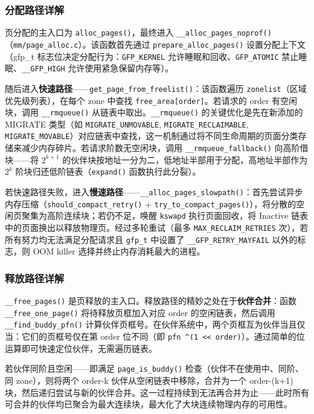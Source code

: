 \documentclass[a4paper]{article}
\begin{document}
\subsubsection{分配路径详解}

页分配的主入口为 \texttt{alloc\_pages()}，最终进入 \texttt{\_\_alloc\_pages\_noprof()}（\texttt{mm/page\_alloc.c}）。该函数首先通过 \texttt{prepare\_alloc\_pages()} 设置分配上下文（gfp\_t 标志位决定分配行为：\texttt{GFP\_KERNEL} 允许睡眠和回收、\texttt{GFP\_ATOMIC} 禁止睡眠、\texttt{\_\_GFP\_HIGH} 允许使用紧急保留内存等）。

随后进入\textbf{快速路径}——\texttt{get\_page\_from\_freelist()}：该函数遍历 \texttt{zonelist}（区域优先级列表），在每个 zone 中查找 \texttt{free\_area[order]}。若请求的 order 有空闲块，调用 \texttt{\_\_rmqueue()} 从链表中取出。\texttt{\_\_rmqueue()} 的关键优化是先在新添加的 MIGRATE 类型（如 \texttt{MIGRATE\_UNMOVABLE}, \texttt{MIGRATE\_RECLAIMABLE}, \texttt{MIGRATE\_MOVABLE}）对应链表中查找，这一机制通过将不同生命周期的页面分类存储来减少内存碎片。若请求阶数无空闲块，调用 \texttt{\_\_rmqueue\_fallback()} 向高阶借块——将 $2^{k+1}$ 的伙伴块按地址一分为二，低地址半部用于分配，高地址半部作为 $2^k$ 阶块归还低阶链表（\texttt{expand()} 函数执行此分裂）。

若快速路径失败，进入\textbf{慢速路径}——\texttt{\_\_alloc\_pages\_slowpath()}：首先尝试异步内存压缩（\texttt{should\_compact\_retry()} + \texttt{try\_to\_compact\_pages()}），将分散的空闲页聚集为高阶连续块；若仍不足，唤醒 \texttt{kswapd} 执行页面回收，将 Inactive 链表中的页面换出以释放物理页。经过多轮重试（最多 \texttt{MAX\_RECLAIM\_RETRIES} 次），若所有努力均无法满足分配请求且 \texttt{gfp\_t} 中设置了 \texttt{\_\_GFP\_RETRY\_MAYFAIL} 以外的标志，则 OOM killer 选择并终止内存消耗最大的进程。

\subsubsection{释放路径详解}

\texttt{\_\_free\_pages()} 是页释放的主入口。释放路径的精妙之处在于\textbf{伙伴合并}：函数 \texttt{\_\_free\_one\_page()} 将待释放页框加入对应 order 的空闲链表，然后调用 \texttt{\_\_find\_buddy\_pfn()} 计算伙伴页框号。在伙伴系统中，两个页框互为伙伴当且仅当：它们的页框号仅在第 order 位不同（即 \texttt{pfn \textasciicircum (1 << order)}）。通过简单的位运算即可快速定位伙伴，无需遍历链表。

若伙伴同阶且空闲——即满足 \texttt{page\_is\_buddy()} 检查（伙伴不在使用中、同阶、同 zone），则将两个 order-k 伙伴从空闲链表中移除，合并为一个 order-(k+1) 块，然后递归尝试与新的伙伴合并。这一过程持续到无法再合并为止——此时所有可合并的伙伴均已聚合为最大连续块，最大化了大块连续物理内存的可用性。
\end{document}
